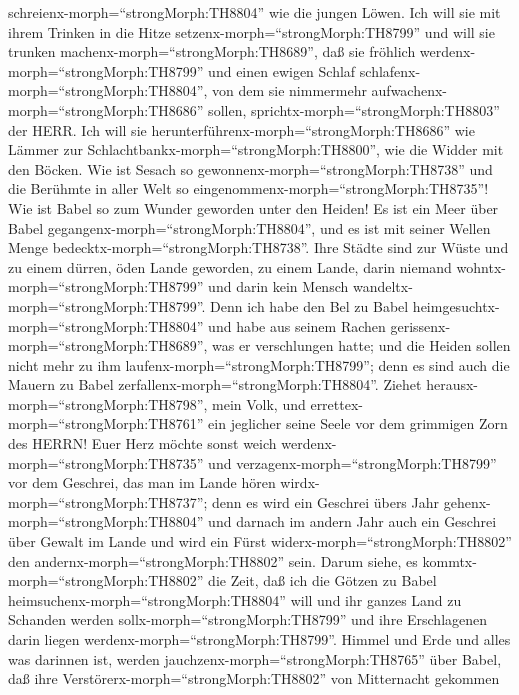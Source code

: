 schreienx-morph=``strongMorph:TH8804'' wie die jungen Löwen.
 Ich will sie mit ihrem Trinken in die Hitze
setzenx-morph=``strongMorph:TH8799'' und will sie trunken
machenx-morph=``strongMorph:TH8689'', daß sie fröhlich
werdenx-morph=``strongMorph:TH8799'' und einen ewigen Schlaf
schlafenx-morph=``strongMorph:TH8804'', von dem sie nimmermehr
aufwachenx-morph=``strongMorph:TH8686'' sollen,
sprichtx-morph=``strongMorph:TH8803'' der HERR.  Ich will
sie herunterführenx-morph=``strongMorph:TH8686'' wie Lämmer zur
Schlachtbankx-morph=``strongMorph:TH8800'', wie die Widder mit den
Böcken.  Wie ist Sesach so
gewonnenx-morph=``strongMorph:TH8738'' und die Berühmte in aller Welt so
eingenommenx-morph=``strongMorph:TH8735''! Wie ist Babel so zum Wunder
geworden unter den Heiden!  Es ist ein Meer über Babel
gegangenx-morph=``strongMorph:TH8804'', und es ist mit seiner Wellen
Menge bedecktx-morph=``strongMorph:TH8738''.  Ihre Städte
sind zur Wüste und zu einem dürren, öden Lande geworden, zu einem Lande,
darin niemand wohntx-morph=``strongMorph:TH8799'' und darin kein Mensch
wandeltx-morph=``strongMorph:TH8799''.  Denn ich habe den
Bel zu Babel heimgesuchtx-morph=``strongMorph:TH8804'' und habe aus
seinem Rachen gerissenx-morph=``strongMorph:TH8689'', was er
verschlungen hatte; und die Heiden sollen nicht mehr zu ihm
laufenx-morph=``strongMorph:TH8799''; denn es sind auch die Mauern zu
Babel zerfallenx-morph=``strongMorph:TH8804''.  Ziehet
herausx-morph=``strongMorph:TH8798'', mein Volk, und
errettex-morph=``strongMorph:TH8761'' ein jeglicher seine Seele vor dem
grimmigen Zorn des HERRN!  Euer Herz möchte sonst weich
werdenx-morph=``strongMorph:TH8735'' und
verzagenx-morph=``strongMorph:TH8799'' vor dem Geschrei, das man im
Lande hören wirdx-morph=``strongMorph:TH8737''; denn es wird ein
Geschrei übers Jahr gehenx-morph=``strongMorph:TH8804'' und darnach im
andern Jahr auch ein Geschrei über Gewalt im Lande und wird ein Fürst
widerx-morph=``strongMorph:TH8802'' den
andernx-morph=``strongMorph:TH8802'' sein.  Darum siehe, es
kommtx-morph=``strongMorph:TH8802'' die Zeit, daß ich die Götzen zu
Babel heimsuchenx-morph=``strongMorph:TH8804'' will und ihr ganzes Land
zu Schanden werden sollx-morph=``strongMorph:TH8799'' und ihre
Erschlagenen darin liegen werdenx-morph=``strongMorph:TH8799''.
 Himmel und Erde und alles was darinnen ist, werden
jauchzenx-morph=``strongMorph:TH8765'' über Babel, daß ihre
Verstörerx-morph=``strongMorph:TH8802'' von Mitternacht gekommen
